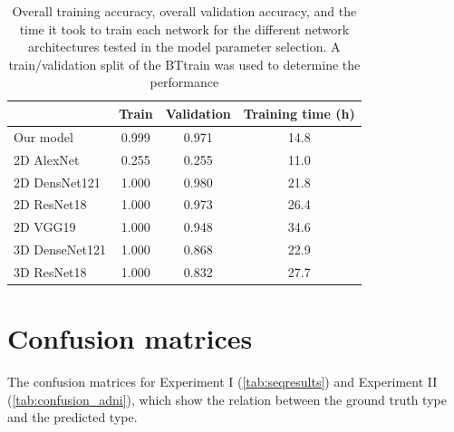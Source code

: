 \begin{subappendices}
\begin{table}[htbp]
 \centering
  \begin{tabular}{L{2.5cm}S[table-format=1.3]S[table-format=1.3]S[table-format=2.1]}
      \toprule
& {\textbf{Train}} & {\textbf{Validation}} & {\textbf{Training time (h)}}\\
    \midrule
    Our model & 0.999 & 0.971 & 14.8\\
    2D AlexNet & 0.255 & 0.255 & 11.0\\
    2D DensNet121 & 1.000 & 0.980 & 21.8\\
    2D ResNet18 & 1.000 & 0.973 & 26.4\\
    2D VGG19 & 1.000 & 0.948 & 34.6\\
    3D DenseNet121 & 1.000 & 0.868 & 22.9\\
    3D ResNet18 & 1.000 & 0.832 & 27.7\\
  \bottomrule
  \end{tabular}
  \caption{Overall training accuracy, overall validation accuracy, and the time it took to train each network for the different network architectures tested in the model parameter selection.
  A train/validation split of the \gls{BTtrain} was used to determine the performance}\label{tab:modelaccuracies}

\end{table}

\clearpage

\section{Confusion matrices}\label{app:confusionmatrices}

The confusion matrices for Experiment I (\cref{tab:seqresults}) and Experiment II (\cref{tab:confusion_adni}), which show the relation between the ground truth \gls{type} and the predicted \gls{type}.


\end{subappendices}
